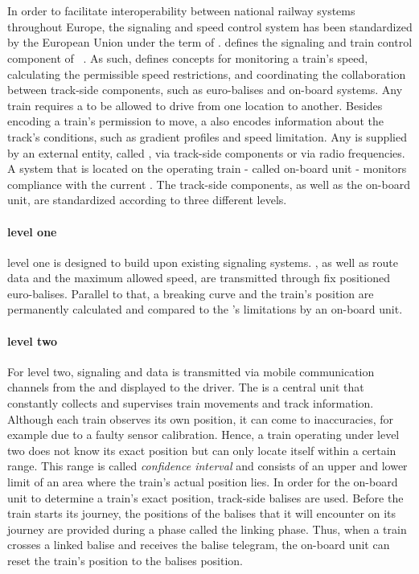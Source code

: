 \section{}
In order to facilitate interoperability between national railway systems throughout Europe, the signaling and speed control system has been standardized by the European Union under the term of .
 defines the signaling and train control component of ~\cite{ETCS26}.
As such,  defines concepts for monitoring a train's speed, calculating the permissible speed restrictions, and coordinating the collaboration between track-side components, such as  euro-balises and on-board systems.
Any train requires a  to be allowed to drive from one location to another.
Besides encoding a train's permission to move, a  also encodes information about the track's conditions, such as gradient profiles and speed limitation.
Any  is supplied by an external entity, called , via track-side components or via radio frequencies.
A system that is located on the operating train - called on-board unit - monitors compliance with the current .
The track-side components, as well as the on-board unit, are standardized according to three different  levels.

\paragraph{ level one}
 level one is designed to build upon existing signaling systems.
, as well as route data and the maximum allowed speed, are transmitted through fix positioned euro-balises.
Parallel to that, a breaking curve and the train's position are permanently calculated and compared to the 's limitations by an on-board unit.

\paragraph{ level two}
For  level two, signaling and  data is transmitted via mobile communication channels from the  and displayed to the driver.
The  is a central unit that constantly collects and supervises train movements and track information.
Although each train observes its own position, it can come to inaccuracies, for example due to a faulty sensor calibration.
Hence, a train operating under  level two does not know its exact position but can only locate itself within a certain range.
This range is called \textit{confidence interval} and consists of an upper and lower limit of an area where the train's actual position lies.
In order for the on-board unit to determine a train's exact position, track-side balises are used.
Before the train starts its journey, the positions of the balises that it will encounter on its journey are provided during a phase called the linking phase.
Thus, when a train crosses a linked balise and receives the balise telegram, the on-board unit can reset the train's position to the balises position.

